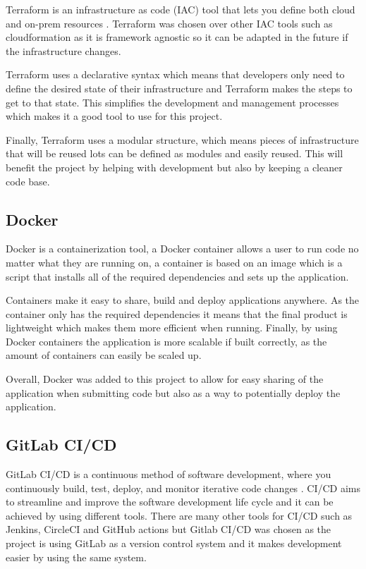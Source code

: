 \documentclass[]{project_report}
\begin{document}
Terraform is an infrastructure as code (IAC) tool that lets you define both cloud and on-prem resources \cite{terraform}. Terraform was chosen over other IAC tools such as cloudformation as it is framework agnostic so it can be adapted in the future if the infrastructure changes.

Terraform uses a declarative syntax which means that developers only need to define the desired state of their infrastructure and Terraform makes the steps to get to that state. This simplifies the development and management processes which makes it a good tool to use for this project.

Finally, Terraform uses a modular structure, which means pieces of infrastructure that will be reused lots can be defined as modules and easily reused. This will benefit the project by helping with development but also by keeping a cleaner code base.

\subsection{Docker}

Docker is a containerization tool, a Docker container allows a user to run code no matter what they are running on, a container is based on an image which is a script that installs all of the required dependencies and sets up the application. 

Containers make it easy to share, build and deploy applications anywhere. As the container only has the required dependencies it means that the final product is lightweight which makes them more efficient when running. Finally, by using Docker containers the application is more scalable if built correctly, as the amount of containers can easily be scaled up. 

Overall, Docker was added to this project to allow for easy sharing of the application when submitting code but also as a way to potentially deploy the application.

\subsection{GitLab CI/CD}

GitLab CI/CD is a continuous method of software development, where you continuously build, test, deploy, and monitor iterative code changes \cite{gitlab}. CI/CD aims to streamline and improve the software development life cycle and it can be achieved by using different tools. There are many other tools for CI/CD such as Jenkins, CircleCI and GitHub actions but Gitlab CI/CD was chosen as the project is using GitLab as a version control system and it makes development easier by using the same system.
\end{document}
